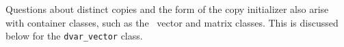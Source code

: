 \documentclass{admbmanual}
\begin{document}
%
%

Questions about distinct copies and the form of the copy initializer also arise
with container classes, such as the \scAD\ vector and matrix classes. This is
discussed below for the \texttt{dvar\_vector} class.
\end{document}

